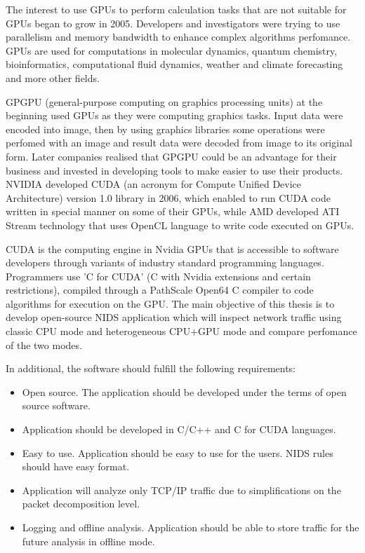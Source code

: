 \documentclass[thesis=M,english]{FITthesis}[2011/07/15]
\begin{document}
The interest to use GPUs to perform calculation tasks that are not suitable for GPUs began to grow in 2005. Developers and investigators were trying to use parallelism and memory bandwidth to enhance complex algorithms perfomance. GPUs are used for computations in molecular dynamics, quantum chemistry, bioinformatics, computational fluid dynamics, weather and climate forecasting and more other fields.

GPGPU (general-purpose computing on graphics processing units) at the beginning used GPUs as they were computing graphics tasks. Input data were encoded into image, then by using graphics libraries some operations were perfomed with an image and result data were decoded from image to its original form. Later companies realised that GPGPU could be an advantage for their business and invested in developing tools to make easier to use their products. NVIDIA developed CUDA (an acronym for Compute Unified Device Architecture) version 1.0 library in 2006, which enabled to run CUDA code written in special manner on some of their GPUs, while AMD developed ATI Stream technology that uses OpenCL language to write code executed on GPUs.

CUDA is the computing engine in Nvidia GPUs that is accessible to software developers through variants of industry standard programming languages. Programmers use 'C for CUDA' (C with Nvidia extensions and certain restrictions), compiled through a PathScale Open64 C compiler to code algorithms for execution on the GPU.
The main objective of this thesis is to develop open-source NIDS application which will inspect network traffic using classic CPU mode and heterogeneous CPU+GPU mode and compare perfomance of the two modes. 

In additional, the software should fulfill the following requirements:
\begin{itemize}
\item Open source. The application should be developed under the terms of open source software.
\item Application should be developed in C/C++ and C for CUDA languages.
\item Easy to use. Application should be easy to use for the users. NIDS rules should have easy format.
\item Application will analyze only TCP/IP traffic due to simplifications on the packet decomposition level.
\item Logging and offline analysis. Application should be able to store traffic for the future analysis in offline mode.
\end{itemize}
\end{document}
